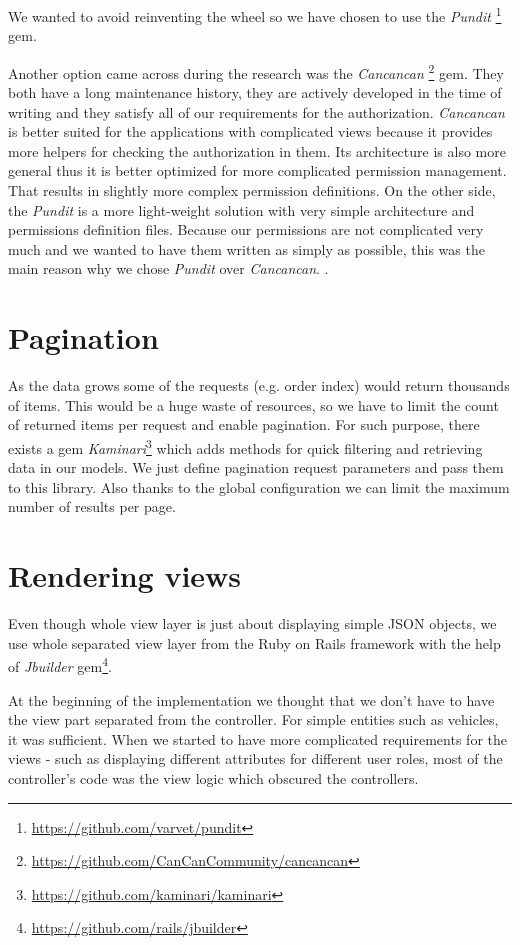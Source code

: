 We wanted to avoid reinventing the wheel so we have chosen to use the \textit{Pundit} \footnote{\url{https://github.com/varvet/pundit}} gem. 

Another option came across during the research was the \textit{Cancancan} \footnote{\url{https://github.com/CanCanCommunity/cancancan}} gem. They both have a long maintenance history, they are actively developed in the time of writing and they satisfy all of our requirements for the authorization. \textit{Cancancan} is better suited for the applications with complicated views because it provides more helpers for checking the authorization in them. Its architecture is also more general thus it is better optimized for more complicated permission management. That results in slightly more complex permission definitions. On the other side, the \textit{Pundit} is a more light-weight solution with very simple architecture and permissions definition files. Because our permissions are not complicated very much and we wanted to have them written as simply as possible, this was the main reason why we chose \textit{Pundit} over \textit{Cancancan}.
.

 \section{Pagination}
 As the data grows some of the requests (e.g. order index) would return thousands of items. This would be a huge waste of resources, so we have to limit the count of returned items per request and enable pagination. For such purpose, there exists a gem \textit{Kaminari}\footnote{\url{https://github.com/kaminari/kaminari}} which adds methods for quick filtering and retrieving data in our models. We just define pagination request parameters and pass them to this library. Also thanks to the global configuration we can limit the maximum number of results per page.

\section{Rendering views}
	Even though whole view layer is just about displaying simple JSON objects, we use whole separated view layer from the Ruby on Rails framework with the help of \textit{Jbuilder} gem\footnote{\url{https://github.com/rails/jbuilder}}.
	
	At the beginning of the implementation we thought that we don't have to have the view part separated from the controller. For simple entities such as vehicles, it was sufficient. When we started to have more complicated requirements for the views - such as displaying different attributes for different user roles, most of the controller's code was the view logic which obscured the controllers.
	
